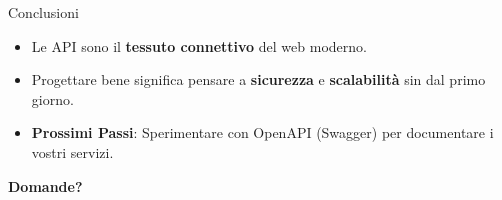 \documentclass[10pt]{beamer}
\begin{document}
\begin{frame}{Conclusioni}
    \begin{itemize}
        \item Le API sono il \textbf{tessuto connettivo} del web moderno.
        \item Progettare bene significa pensare a \textbf{sicurezza} e \textbf{scalabilit\`a} sin dal primo giorno.
        \item \textbf{Prossimi Passi}: Sperimentare con OpenAPI (Swagger) per documentare i vostri servizi.
    \end{itemize}
    \centering
    \vspace{0.8cm}
    \Large \textbf{\textcolor{primary}{Domande?}}
\end{frame}
\end{document}
